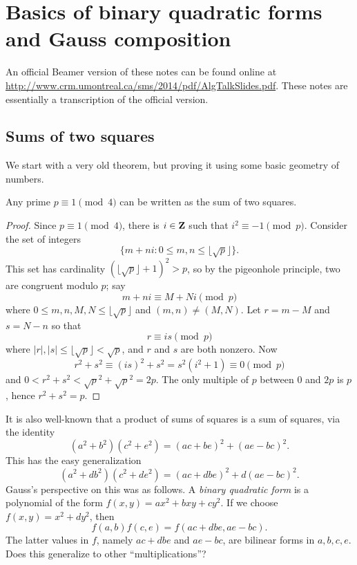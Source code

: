 
\section{Basics of binary quadratic forms and Gauss composition}\label{sec:granville-i}

An official Beamer version of these notes can be found online at 
\url{http://www.crm.umontreal.ca/sms/2014/pdf/AlgTalkSlides.pdf}. These notes 
are essentially a transcription of the official version. 





\subsection{Sums of two squares}

We start with a very old theorem, but proving it using some basic geometry of 
numbers. 

\begin{theo}
Any prime $p\equiv 1\pmod 4$ can be written as the sum of two squares. 
\end{theo}
\begin{proof}
Since $p\equiv 1\pmod 4$, there is $i\in \mathbf{Z}$ such that $i^2\equiv -1\pmod p$. 
Consider the set of integers 
\[
  \{m+n i:0\leqslant m,n\leqslant \lfloor \sqrt p\rfloor\} .
\]
This set has cardinality $(\lfloor\sqrt p\rfloor+1)^2>p$, so by the pigeonhole 
principle, two are congruent modulo $p$; say 
\[
  m+n i\equiv M+N i\pmod p
\]
where $0\leqslant m,n,M,N\leqslant \lfloor\sqrt p\rfloor$ and 
$(m,n)\ne (M,N)$. Let $r=m-M$ and $s=N-n$ so that 
\[
  r\equiv i s\pmod p 
\]
where $|r|,|s|\leqslant \lfloor \sqrt p\rfloor < \sqrt p$, and $r$ and $s$ are 
both nonzero. Now 
\[
  r^2+s^2 \equiv (i s)^2 +s^2 = s^2(i^2+1) \equiv 0\pmod p
\]
and $0<r^2+s^2 < \sqrt p^2+\sqrt p^2=2 p$. The only multiple of $p$ between 
$0$ and $2 p$ is $p$, hence $r^2+s^2=p$. 
\end{proof}

It is also well-known that a product of sums of squares is a sum of squares, 
via the identity 
\[
  (a^2+b^2)(c^2+e^2) = (a c+ b e)^2 + (a e-b c)^2 .
\]
This has the easy generalization 
\[
  (a^2+d b^2)(c^2+ d e^2) = (a c+d b e)^2 + d(a e- b c)^2 .
\]
Gauss's perspective on this was as follows. A \emph{binary quadratic form} is 
a polynomial of the form $f(x,y) = a x^2 + b x y + c y^2$. If we choose 
$f(x,y) = x^2+ d y^2$, then 
\[
  f(a,b)f(c,e) = f(a c+d b e,a e-b c) .
\]
The latter values in $f$, namely $a c+d b e$ and $a e-b c$, are bilinear 
forms in $a,b,c,e$. Does this generalize to other ``multiplications''? 






